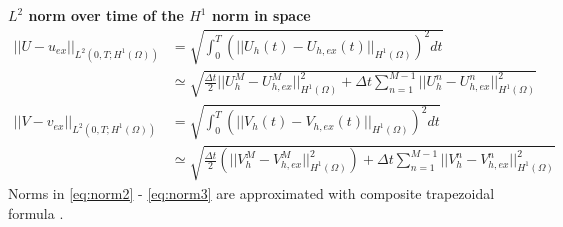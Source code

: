 \textbf{$L^2$ norm over time of the $H^1$ norm in space}
\begin{equation}\label{eq:norm3}\begin{aligned}
  ||U-u_{ex}||_{L^2\left(0, T; H^1\left(\Omega\right) \right)} & = \sqrt{\int_0^{T} \left( ||U_h(t)-U_{h,ex}(t)||_{H^1\left(\Omega\right)} \right)^2 dt} \\ & \simeq \sqrt{ \frac{\Delta t}{2} ||U_h^M- U_{h,ex}^M||_{H^1\left(\Omega\right)}^2 + \Delta t \sum_{n = 1}^{M-1} ||U_h^n - U_{h, ex}^n||_{H^1\left(\Omega\right)}^2 } \\
  ||V-v_{ex}||_{L^2\left(0, T; H^1\left(\Omega\right) \right)} & = \sqrt {\int_0^{T} \left(||V_h(t)-V_{h,ex}(t)||_{H^1\left(\Omega\right)}\right)^2 dt }\\ & \simeq \sqrt{ \frac{\Delta t}{2} \left( ||V_h^M- V_{h,ex}^M||_{H^1\left(\Omega\right)}^2 \right) + \Delta t \sum_{n = 1}^{M-1} ||V_h^n - V_{h, ex}^n||_{H^1\left(\Omega\right)}^2}
\end{aligned} \end{equation}
Norms in \eqref{eq:norm2} - \eqref{eq:norm3} are approximated with composite trapezoidal formula \cite{NM:Quarteroni}.

